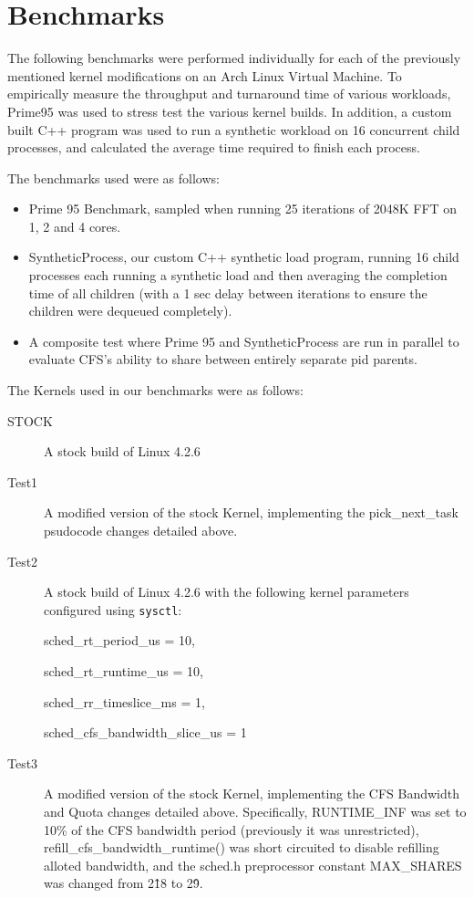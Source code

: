 \section{Benchmarks}

The following benchmarks were performed individually for each of the previously mentioned kernel modifications on an Arch Linux Virtual Machine. To empirically measure the throughput and turnaround time of various workloads, Prime95 was used to stress test the various kernel builds. In addition, a custom built C++ program was used to run a synthetic workload on 16 concurrent child processes, and calculated the average time required to finish each process.

The benchmarks used were as follows:
\begin{itemize}
	\item Prime 95 Benchmark, sampled when running 25 iterations of 2048K FFT on 1, 2 and 4 cores.
	\item SyntheticProcess, our custom C++ synthetic load program, running 16 child processes each running a synthetic load and then averaging the completion time of all children (with a 1 sec delay between iterations to ensure the children were dequeued completely).
	\item A composite test where Prime 95 and SyntheticProcess are run in parallel to evaluate CFS's ability to share between entirely separate pid parents.
\end{itemize}

\noindent The Kernels used in our benchmarks were as follows:
\begin{description}
	\item[STOCK] A stock build of Linux 4.2.6
	\item[Test1] A modified version of the stock Kernel, implementing the pick\_next\_task psudocode changes detailed above.
	\item[Test2] A stock build of Linux 4.2.6 with the following kernel parameters configured using \texttt{sysctl}:
	
		sched\_rt\_period\_us = 10,
		
		sched\_rt\_runtime\_us = 10,
		
		sched\_rr\_timeslice\_ms = 1,
		
		sched\_cfs\_bandwidth\_slice\_us = 1
	\item[Test3] A modified version of the stock Kernel, implementing the CFS Bandwidth and Quota changes detailed above. Specifically, RUNTIME\_INF was set to 10\% of the CFS bandwidth period (previously it was unrestricted), refill\_cfs\_bandwidth\_runtime() was short circuited to disable refilling alloted bandwidth, and the sched.h preprocessor constant MAX\_SHARES was changed from 2\^18 to 2\^9.
\end{description}

